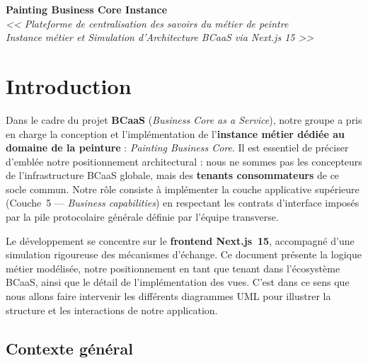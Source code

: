 \documentclass[12pt,a4paper]{report}
\begin{document}
\begin{center}
    {\LARGE\textbf{Painting Business Core Instance}}\\[0.3cm]
    {\Large\textit{<< Plateforme de centralisation des savoirs du métier de peintre\\ Instance métier et Simulation d'Architecture BCaaS via Next.js 15 >>}}\\[1cm]
\end{center}

\tableofcontents
\newpage

\section{Introduction}

Dans le cadre du projet \textbf{BCaaS} (\textit{Business Core as a Service}), notre groupe a pris en charge la conception et l'implémentation de l'\textbf{instance métier dédiée au domaine de la peinture} : \textit{Painting Business Core}. Il est essentiel de préciser d'emblée notre positionnement architectural : nous ne sommes pas les concepteurs de l'infrastructure BCaaS globale, mais des \textbf{tenants consommateurs} de ce socle commun. Notre rôle consiste à implémenter la couche applicative supérieure (Couche~5 --- \textit{Business capabilities}) en respectant les contrats d'interface imposés par la pile protocolaire générale définie par l'équipe transverse.

Le développement se concentre sur le \textbf{frontend Next.js~15}, accompagné d'une simulation rigoureuse des mécanismes d'échange. Ce document présente la logique métier modélisée, notre positionnement en tant que tenant dans l'écosystème BCaaS, ainsi que le détail de l'implémentation des vues. C'est dans ce sens que nous allons faire intervenir les différents diagrammes UML pour illustrer la structure et les interactions de notre application.

\subsection*{Contexte général}
\end{document}
